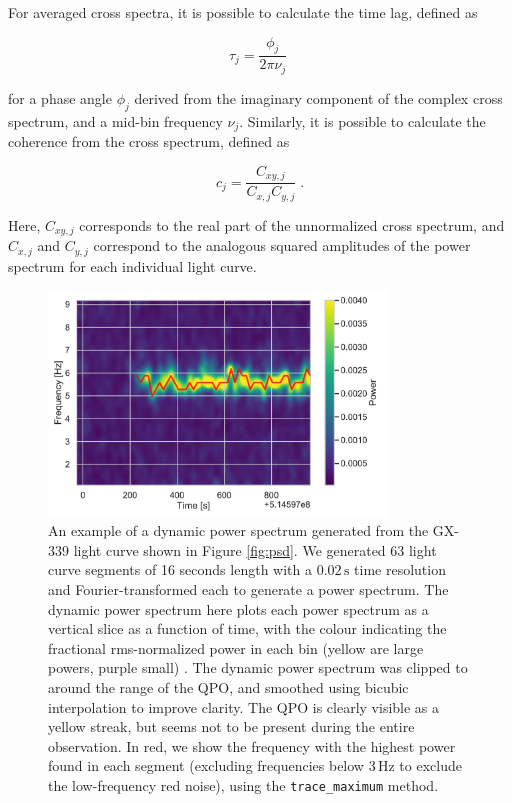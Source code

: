 \documentclass[twocolumn]{aastex62}
\begin{document}
For averaged cross spectra, it is possible to calculate the time lag, defined as

\[
\tau_j = \frac{\phi_j}{2\pi\nu_j} \; 
\]

\noindent for a phase angle $\phi_j$ derived from the imaginary component of the complex cross spectrum, and a mid-bin frequency $\nu_j$. Similarly, it is possible to calculate the coherence \citep{vaughan1997,nowak1999} from the cross spectrum, defined as 

\begin{equation}
c_j = \frac{C_{xy,j}}{C_{x,j} C_{y,j}} \; . 
\end{equation}

\noindent Here, $C_{xy,j}$ corresponds to the real part of the unnormalized cross spectrum, and $C_{x,j}$ and $C_{y,j}$ correspond to the analogous squared amplitudes of the power spectrum for each individual light curve. 


\begin{figure}[htbp]
\begin{center}
\includegraphics[width=9cm]{../figures/dyn_spec.pdf}
\caption{An example of a dynamic power spectrum generated from the GX-339 light curve shown in Figure \ref{fig:psd}. We generated 63 light curve segments of 16 seconds length with a $0.02\,\mathrm{s}$ time resolution and Fourier-transformed each to generate a power spectrum. The dynamic power spectrum here plots each power spectrum as a vertical slice as a function of time, with the colour indicating the fractional rms-normalized power in each bin (yellow are large powers, purple small) . The dynamic power spectrum was clipped to around the range of the QPO, and smoothed using bicubic interpolation to improve clarity. The QPO is clearly visible as a yellow streak, but seems not to be present during the entire observation. In red, we show the frequency with the highest power found in each segment (excluding frequencies below $3\,\mathrm{Hz}$ to exclude the low-frequency red noise), using the \texttt{trace\_maximum} method.}
\label{fig:dynspec}
\end{center}
\end{figure}
\end{document}
